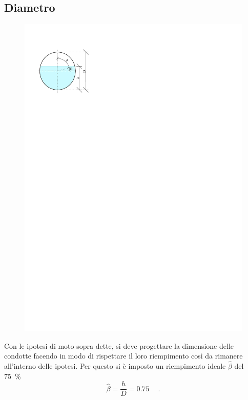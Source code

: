 \subsection{Diametro}
\begin{figure}[H]
    \centering
    \includegraphics[]{IMG/RiempimentoCondotta.pdf}
\end{figure}
Con le ipotesi di moto sopra dette, si deve progettare la dimensione delle condotte facendo in modo di rispettare il loro riempimento così da rimanere all'interno delle ipotesi. 
Per questo si è imposto un riempimento ideale $\hat{\beta}$ del \SI{75}{\percent}
\begin{equation}
    \hat{\beta} = \frac{h}{D} = \SI{0.75}{} \quad .
\end{equation}


